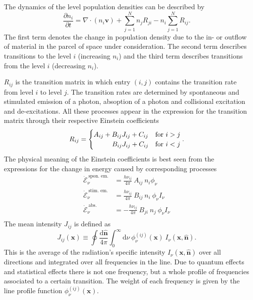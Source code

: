 \documentclass[]{article}
\newcommand{\D}{\text{d}}
\begin{document}
The dynamics of the level population densities can be described by
\begin{equation}
\frac{\partial n_{i}}{\partial t} = \nabla \cdot \left( n_{i} \textbf{v} \right) + \sum_{j=1}^{N} n_{j} R_{ji} - n_{i} \sum_{j=1}^{N} R_{ij} .
\end{equation}
The first term denotes the change in population density due to the in- or outflow of material in the parcel of space under consideration. The second term describes transitions to the level $i$ (increasing $n_{i}$) and the third term describes transitions from the level $i$ (decreasing $n_{i}$).

\bigskip

$R_{ij}$ is the transition matrix in which entry $(i,j)$ contains the transition rate from level $i$ to level $j$. The transition rates are determined by spontaneous and stimulated emission of a photon, absoption of a photon and collisional excitation and de-excitations. All these processes appear in the expression for the transition matrix through their respective Einstein coefficients
\begin{equation}
R_{ij} =
\begin{cases}  A_{ij} + B_{ij}  J_{ij} + C_{ij}   & \text{for } i>j \\
\hspace{9.5mm} B_{ij}  J_{ij} + C_{ij} & \text{for } i<j
\end{cases} .
\end{equation}
The physical meaning of the Einstein coefficients is best seen from the expressions for the change in energy caused by corresponding processes
\begin{equation}
\begin{split}
\dot{\mathcal{E}}^{\ \text{spon. em.}}_{\nu} &= \frac{h\nu_{ij}}{4\pi} \ A_{ij} \ n_{i} \phi_{\nu} \\
\dot{\mathcal{E}}^{\ \text{stim. em.}}_{\nu}  &=  \frac{h\nu_{ij}}{4\pi} \ B_{ij} \ n_{i} \ \phi_{\nu} I_{\nu} \\
\dot{\mathcal{E}}^{\ \text{abs.}}_{\nu} &=  -\frac{h\nu_{ij}}{4\pi} \ B_{ji} \ n_{j} \ \phi_{\nu} I_{\nu} \\
\end{split}
\end{equation}
The mean intensity $J_{ij}$ is defined as
\begin{equation}
J_{ij}(\textbf{x}) \equiv \oint \frac{\D \hat{\textbf{n}}}{4 \pi} \int_{0}^{\infty} \D \nu \ \phi^{(ij)}_{\nu}(\textbf{x}) \ I_{\nu}(\textbf{x},\hat{\textbf{n}}).
\end{equation}
This is the average of the radiation's specific intensity  $I_{\nu}(\textbf{x},\hat{\textbf{n}})$ over all directions and integrated over all frequencies in the line. Due to quantum effects and statistical effects there is not one frequency, but a whole profile of frequencies associated to a certain transition. The weight of each frequency is given by the line profile function $\phi^{(ij)}_{\nu}(\textbf{x})$.
\end{document}
